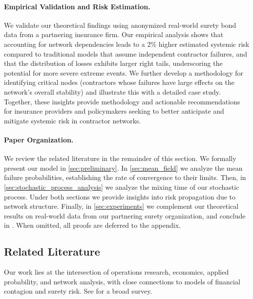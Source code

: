 \documentclass[mnsc,nonblindrev]{informs3}
\begin{document}
\paragraph{Empirical Validation and Risk Estimation.}
We validate our theoretical findings using anonymized real-world surety bond data from a partnering insurance firm. Our empirical analysis shows that accounting for network dependencies leads to a 2\% higher estimated systemic risk compared to traditional models that assume independent contractor failures, and that the distribution of losses exhibits larger right tails, underscoring the potential for more severe extreme events. We further develop a methodology for identifying critical nodes (contractors whose failures have large effects on the network's overall stability) and illustrate this with a detailed case study.
Together, these insights provide methodology and actionable recommendations for insurance providers and policymakers seeking to better anticipate and mitigate systemic risk in contractor networks.


\paragraph{Paper Organization.} We review the related literature in the remainder of this section. We formally present our model in \cref{sec:preliminary}.  In \cref{sec:mean_field} we analyze the mean failure probabilities, establishing the rate of convergence to their limits. Then, in \cref{sec:stochastic_process_analysis} we analyze the mixing time of our stochastic process. Under both sections we provide insights into risk propagation due to network structure. Finally, in \cref{sec:experiments} we complement our theoretical results on real-world data from our partnering surety organization, and conclude in .  When omitted, all proofs are deferred to the appendix.
\subsection{Related Literature}
\label{sec:related_work}

Our work lies at the intersection of operations research, economics, applied probability, and network analysis, with close connections to models of financial contagion and surety risk. See \citet{caccioli2018network} for a broad survey.
\end{document}
